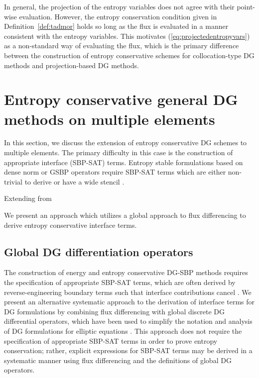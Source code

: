 \documentclass[preprint,10pt]{article}
\theoremstyle{definition}
\theoremstyle{lemma}
\theoremstyle{theorem}
\theoremstyle{assumption}
\begin{document}
In general, the projection of the entropy variables does not agree with their point-wise evaluation.  However, the entropy conservation condition given in Definition~\ref{def:tadmor} holds so long as the flux is evaluated in a manner consistent with the entropy variables.  This motivates (\ref{eq:projectedentropyvars}) as a non-standard way of evaluating the flux, which is the primary difference between the construction of entropy conservative schemes for collocation-type DG methods and projection-based DG methods.  

\section{Entropy conservative general DG methods on multiple elements}
\label{sec:ecdg2}

In this section, we discuss the extension of entropy conservative DG schemes to multiple elements.  The primary difficulty in this case is the construction of appropriate interface (SBP-SAT) terms.  Entropy stable formulations based on dense norm or GSBP operators require SBP-SAT terms which are either non-trivial to derive or have a wide stencil \cite{fernandez2016simultaneous, ranocha2017extended}.  

Extending from 

We present an approach which utilizes a global approach to flux differencing to derive entropy conservative interface terms.  

\subsection{Global DG differentiation operators}

The construction of energy and entropy conservative DG-SBP methods requires the specification of appropriate SBP-SAT terms, which are often derived by reverse-engineering  boundary terms such that interface contributions cancel \cite{fernandez2016simultaneous, ranocha2017comparison, ranocha2017extended}.  We present an alternative systematic approach to the derivation of interface terms for DG formulations by combining flux differencing with global discrete DG differential operators, which have been used to simplify the notation and analysis of DG formulations for elliptic equations \cite{di2011mathematical, wang2013weak}.  This approach does not require the specification of appropriate SBP-SAT terms in order to prove entropy conservation; rather, explicit expressions for SBP-SAT terms may be derived in a systematic manner using flux differencing and the definitions of global DG operators.  
\end{document}
